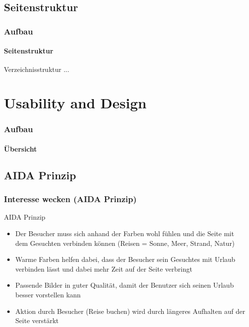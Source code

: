 \documentclass[xcolor=dvipsnames]{beamer}
\begin{document}
\subsection{Seitenstruktur}
\begin{frame} %
  \frametitle{Aufbau} %
  \framesubtitle{Seitenstruktur} %
  \begin{block}{Verzeichnisstruktur}
	...
  \end{block}
\end{frame}


\section{Usability and Design}
\begin{frame} %
  \frametitle{Aufbau} %
  \framesubtitle{Übersicht} %
	\tableofcontents[currentsection] 
\end{frame}

\subsection{AIDA Prinzip}
\begin{frame} %
  \frametitle{Interesse wecken (AIDA Prinzip)} %
  \begin{block}{AIDA Prinzip}
	\begin{itemize}
		\item Der Besucher muss sich anhand der Farben wohl fühlen und die Seite mit dem Gesuchten verbinden können (Reisen = Sonne, Meer, Strand, Natur)
		\item Warme Farben helfen dabei, dass der Besucher sein Gesuchtes mit Urlaub verbinden lässt und dabei mehr Zeit auf der Seite verbringt
		\item Passende Bilder in guter Qualität, damit der Benutzer sich seinen Urlaub besser vorstellen kann
		\item Aktion durch Besucher (Reise buchen) wird durch längeres Aufhalten auf der Seite verstärkt
	\end{itemize}
  \end{block}
\end{frame}
\end{document}
